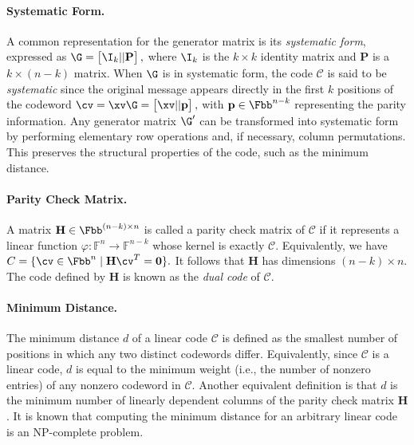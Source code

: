 \paragraph{Systematic Form.}
A common representation for the generator matrix is its \emph{systematic form}, expressed as
\(
\G = \begin{bmatrix} \I_k || \mathbf{P} \end{bmatrix},
\)
where $\I_k$ is the $k\times k$ identity matrix and $\mathbf{P}$ is a $k \times (n-k)$ matrix. When $\G$ is in systematic form, the code $\mathcal{C}$ is said to be \emph{systematic} since the original message appears directly in the first $k$ positions of the codeword
\(
\cv = \xv\G = \begin{bmatrix} \xv || \mathbf{p} \end{bmatrix},
\)
with $\mathbf{p}\in\Fbb^{n-k}$ representing the parity information. Any generator matrix $\G'$ can be transformed into systematic form by performing elementary row operations and, if necessary, column permutations. This preserves the structural properties of the code, such as the minimum distance.

\paragraph{Parity Check Matrix.}
A matrix $\mathbf{H}\in\Fbb^{(n-k)\times n}$ is called a parity check matrix of $\mathcal{C}$ if it represents a linear function 
\(
\varphi: \mathbb{F}^n \to \mathbb{F}^{n-k}
\)
whose kernel is exactly $\mathcal{C}$. Equivalently, we have
\(
C = \{ \cv \in \Fbb^n \mid \mathbf{H}\cv^T = \mathbf{0} \}.
\)
It follows that $\mathbf{H}$ has dimensions $(n-k)\times n$. The code defined by $\mathbf{H}$ is known as the \emph{dual code} of $\mathcal{C}$.

\paragraph{Minimum Distance.}
The minimum distance $d$ of a linear code $\mathcal{C}$ is defined as the smallest number of positions in which any two distinct codewords differ. Equivalently, since $\mathcal{C}$ is a linear code, $d$ is equal to the minimum weight (i.e., the number of nonzero entries) of any nonzero codeword in $\mathcal{C}$. Another equivalent definition is that $d$ is the minimum number of linearly dependent columns of the parity check matrix $\mathbf{H}$. It is known that computing the minimum distance for an arbitrary linear code is an NP-complete problem.

